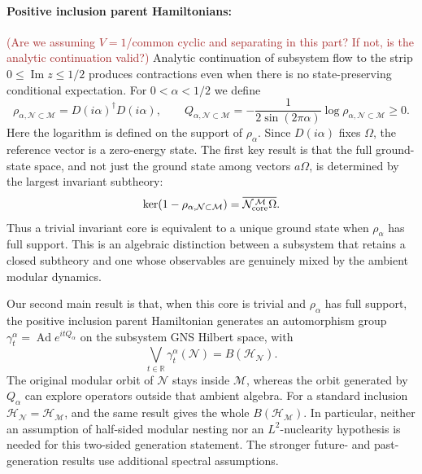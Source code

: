 \documentclass[a4paper,11pt]{article}
\theoremstyle{definition}
\newcommand{\mN}{\mathcal{N}}
\newcommand{\mH}{\mathcal{H}}
\newcommand{\mM}{\mathcal{M}}
\newcommand{\KL}[1]{\textcolor{brown}{#1}}
\begin{document}
\paragraph{Positive inclusion parent Hamiltonians:}
\KL{(Are we assuming $V=1$/common cyclic and separating in this part? If not, is the analytic continuation valid?) }Analytic continuation of subsystem flow to the strip $0\leq\operatorname{Im}z\leq1/2$ produces contractions even when there is no state-preserving conditional expectation. For $0<\alpha<1/2$ we define
\begin{equation}
 \rho_{\alpha,\mN\subset\mM}=D(i\alpha)^\dagger D(i\alpha),\qquad
 Q_{\alpha,\mN\subset\mM}
 =-\frac{1}{2\sin(2\pi\alpha)}\log\rho_{\alpha,\mN\subset\mM}\geq0 .
 \label{eq:intro-Halpha}
\end{equation}
Here the logarithm is defined on the support of $\rho_\alpha$. Since $D(i\alpha)$ fixes $\Omega$, the reference vector is a zero-energy state. The first key result is that the full ground-state space, and not just the ground state among vectors $a\Omega$, is determined by the largest invariant subtheory:
\begin{equation}
 \ker(1-\rho_{\alpha,\mN\subset\mM})
 =\overline{\mN_{\rm core}^{\,\mM}\Omega}.
 \label{eq:intro-ground-core}
\end{equation}
Thus a trivial invariant core is equivalent to a unique ground state when $\rho_\alpha$ has full support. This is an algebraic distinction between a subsystem that retains a closed subtheory and one whose observables are genuinely mixed by the ambient modular dynamics.

Our second main result is that, when this core is trivial and $\rho_\alpha$ has full support, the positive inclusion parent Hamiltonian generates an automorphism group $\gamma_t^\alpha=\operatorname{Ad}e^{itQ_\alpha}$ on the subsystem GNS Hilbert space, with
\begin{equation}
 \boxed{\qquad
 \bigvee_{t\in\mathbb R}\gamma_t^\alpha(\mN)=B(\mH_{\mN}) .\qquad}
 \label{eq:intro-full-generation}
\end{equation}
The original modular orbit of $\mN$ stays inside $\mM$, whereas the orbit generated by $Q_\alpha$ can explore operators outside that ambient algebra. For a standard inclusion $\mH_{\mN}=\mH_{\mM}$, and the same result gives the whole $B(\mH_{\mM})$. In particular, neither an assumption of half-sided modular nesting nor an $L^2$-nuclearity hypothesis is needed for this two-sided generation statement. The stronger future- and past-generation results use additional spectral assumptions.
\end{document}
